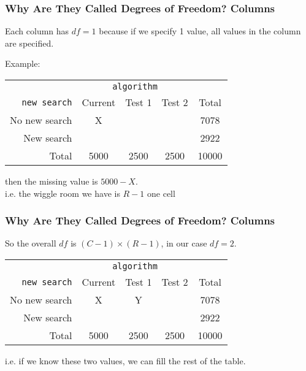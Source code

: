\documentclass[handout]{beamer}
\newcommand{\blue}[1]{\textcolor{blue2}{#1}}
\begin{document}
\begin{frame}
\frametitle{Why Are They Called Degrees of Freedom? Columns}

Each column has $df=1$ because if we specify 1 value, all values in the column are specified.  

\vspace{0.5cm}

\pause Example:
\begin{center}
  \begin{tabular}{r|ccc|c}
& \multicolumn{3}{c|}{{\tt algorithm}} & \\
       {\tt new search} & Current & Test 1 & Test 2 & Total \\ 
\hline
    No new search & X &  &  & 7078 \\ 
    New search &  &  &  & 2922 \\ 
\hline
    Total & 5000 & 2500 & 2500 & 10000 \\ 
  \end{tabular}
\end{center}
\pause
then the missing value is $5000-X$.\\ 
i.e. the \blue{wiggle room} we have is $R-1$ one cell

\end{frame}


\begin{frame}
\frametitle{Why Are They Called Degrees of Freedom? Columns}

So the overall $df$ is $(C-1)\times(R-1)$, in our case $df=2$.

\vspace{0.5cm}

\begin{center}
  \begin{tabular}{r|ccc|c}
& \multicolumn{3}{c|}{{\tt algorithm}} & \\
       {\tt new search} & Current & Test 1 & Test 2 & Total \\ 
\hline
    No new search & X & Y &  & 7078 \\ 
    New search &  &  &  & 2922 \\ 
\hline
    Total & 5000 & 2500 & 2500 & 10000 \\ 
  \end{tabular}
\end{center}
\pause
i.e. if we know these two values, we can fill the rest of the table.

\end{frame}
\end{document}
